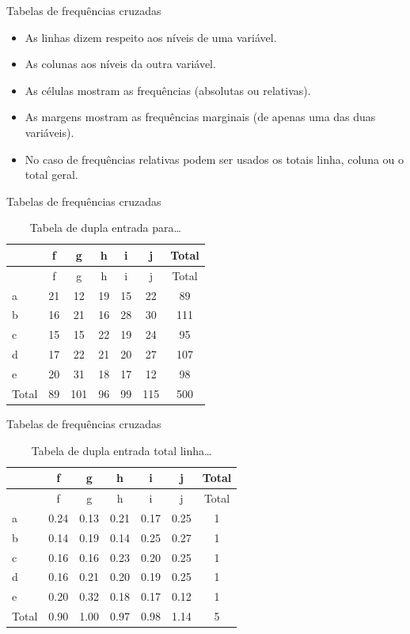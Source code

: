 \documentclass[
  ignorenonframetext,
  serif,
  professionalfont,
  usenames,
  dvipsnames,
  aspectratio = 169]{beamer}
\providecommand{\tightlist}{%
  \setlength{\itemsep}{0pt}\setlength{\parskip}{0pt}}
\renewcommand{\tightlist}{%
  \setlength{\itemsep}{0\baselineskip}
  \setlength{\parskip}{0.25\baselineskip}
}
\begin{document}
\begin{frame}{Tabelas de frequências cruzadas}
\protect\hypertarget{tabelas-de-frequuxeancias-cruzadas}{}
\begin{itemize}
\tightlist
\item
  As linhas dizem respeito aos níveis de uma variável.
\item
  As colunas aos níveis da outra variável.
\item
  As células mostram as frequências (absolutas ou relativas).
\item
  As margens mostram as frequências marginais (de apenas uma das duas
  variáveis).
\item
  No caso de frequências relativas podem ser usados os totais linha,
  coluna ou o total geral.
\end{itemize}
\end{frame}

\begin{frame}{Tabelas de frequências cruzadas}
\protect\hypertarget{tabelas-de-frequuxeancias-cruzadas-1}{}
\begin{longtable}[]{@{}lcccccc@{}}
\caption{Tabela de dupla entrada para\ldots{}}\tabularnewline
\toprule()
& f & g & h & i & j & Total \\
\midrule()
\endfirsthead
\toprule()
& f & g & h & i & j & Total \\
\midrule()
\endhead
a & 21 & 12 & 19 & 15 & 22 & 89 \\
b & 16 & 21 & 16 & 28 & 30 & 111 \\
c & 15 & 15 & 22 & 19 & 24 & 95 \\
d & 17 & 22 & 21 & 20 & 27 & 107 \\
e & 20 & 31 & 18 & 17 & 12 & 98 \\
Total & 89 & 101 & 96 & 99 & 115 & 500 \\
\bottomrule()
\end{longtable}
\end{frame}

\begin{frame}{Tabelas de frequências cruzadas}
\protect\hypertarget{tabelas-de-frequuxeancias-cruzadas-2}{}
\begin{longtable}[]{@{}lcccccc@{}}
\caption{Tabela de dupla entrada total linha\ldots{}}\tabularnewline
\toprule()
& f & g & h & i & j & Total \\
\midrule()
\endfirsthead
\toprule()
& f & g & h & i & j & Total \\
\midrule()
\endhead
a & 0.24 & 0.13 & 0.21 & 0.17 & 0.25 & 1 \\
b & 0.14 & 0.19 & 0.14 & 0.25 & 0.27 & 1 \\
c & 0.16 & 0.16 & 0.23 & 0.20 & 0.25 & 1 \\
d & 0.16 & 0.21 & 0.20 & 0.19 & 0.25 & 1 \\
e & 0.20 & 0.32 & 0.18 & 0.17 & 0.12 & 1 \\
Total & 0.90 & 1.00 & 0.97 & 0.98 & 1.14 & 5 \\
\bottomrule()
\end{longtable}
\end{frame}
\end{document}
